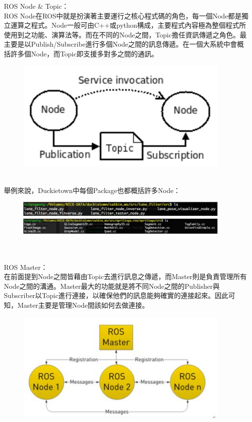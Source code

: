 \documentclass{article}
\begin{document}
ROS Node \& Topic：
\\ROS Node在ROS中就是扮演著主要運行之核心程式碼的角色，每一個Node都是獨立運算之程式。Node一般可由C++或python構成，主要程式內容極為整個程式所使用到之功能、演算法等。而在不同的Node之間，Topic擔任資訊傳遞之角色。最主要是以Publish/Subscribe進行多個Node之間的訊息傳遞。在一個大系統中會概括許多個Node，而Topic即支援多對多之間的通訊。
\begin{figure}[htp]
    \begin{center}
        \includegraphics[width=300pt]{pic/圖片18.jpg}
    \end{center}
\end{figure}
\\舉例來說，Duckietown中每個Package也都概括許多Node：
\begin{figure}[htp]
    \begin{center}
        \includegraphics[width=300pt]{pic/圖片19.jpg}
    \end{center}
\end{figure}
\\
\\ROS Master：
\\在前面提到Node之間皆藉由Topic去進行訊息之傳遞，而Master則是負責管理所有Node之間的溝通。Master最大的功能就是將不同Node之間的Publisher與Subscriber以Topic進行連接，以確保他們的訊息能夠確實的連接起來。因此可知，Master主要是管理Node間該如何去做連接。
\begin{figure}[htp]
    \begin{center}
        \includegraphics[width=300pt]{pic/圖片20.jpg}
    \end{center}
\end{figure}
\end{document}

